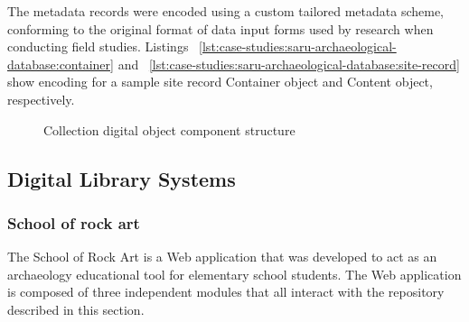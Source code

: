 \tablespacing

\bodyspacing

The metadata records were encoded using a custom tailored metadata scheme, conforming to the original format of data input forms used by research when conducting field studies. Listings ~\ref{lst:case-studies:saru-archaeological-database:container} and ~\ref{lst:case-studies:saru-archaeological-database:site-record} show encoding for a sample site record Container object and Content object, respectively.


\begin{figure}
 \centering
 \framebox[\textwidth]{
 
 }
 \caption{Collection digital object component structure}
 \label{fig:case-studies:saru-storage:object-relationships}
\end{figure}





\subsection[DLSes]{Digital Library Systems}
\label{sec:case-studies:saru-archaeological-database:use-cases}

\subsubsection{School of rock art}
\label{sec:case-studie :saru-archaeological-database:use-cases:school-of-rock-art}

The School of Rock Art \citep{Crawford2012} is a Web application that was developed to act as an archaeology educational tool for elementary school students. The Web application is composed of three independent modules that all interact with the repository described in this section.

